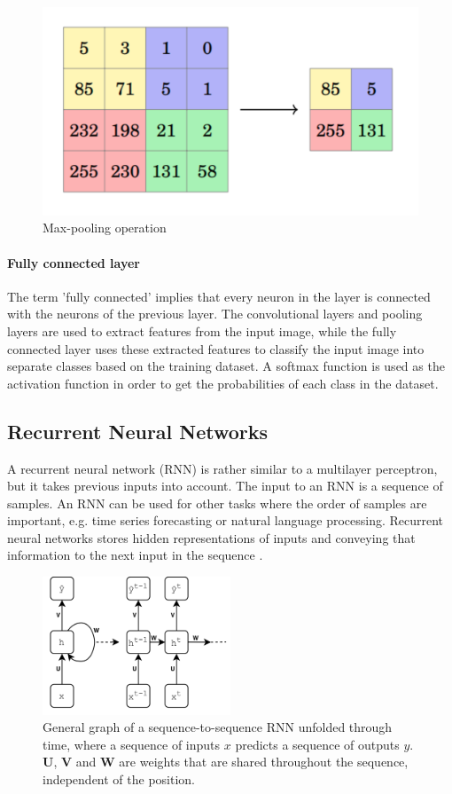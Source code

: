             \begin{figure}[h!]
                \centering
                    \includegraphics[width=0.4\linewidth]{figures/maxpooling.png}
                \caption{Max-pooling operation}
                \label{fig:maxpool}
            \end{figure}

            \paragraph{Fully connected layer} The term 'fully connected' implies that every neuron in the layer is connected with the neurons of the previous layer. 
            The convolutional layers and pooling layers are used to extract features from the input image, while the fully connected layer uses these extracted features to classify the input image into separate classes based on the training dataset. 
            A softmax function is used as the activation function in order to get the probabilities of each class in the dataset. 

        \subsection{Recurrent Neural Networks}

            A recurrent neural network (RNN) is rather similar to a multilayer perceptron, but it takes previous inputs into account. 
            The input to an RNN is a sequence of samples. 
            An RNN can be used for other tasks where the order of samples are important, e.g. time series forecasting or natural language processing.
            Recurrent neural networks stores hidden representations of inputs and conveying that information to the next input in the sequence \cite{Goodfellow-et-al-2016}. 

            \begin{figure}[t]
                \centering
                \includegraphics[width=0.5\textwidth]{figures/simple_rnn.png}
                \caption{General graph of a sequence-to-sequence RNN unfolded through time, where a sequence of inputs $x$ predicts a sequence of outputs $y$. $\mathbf{U}$, $\mathbf{V}$ and $\mathbf{W}$ are weights that are shared throughout the sequence, independent of the position.}
                \label{fig:rnn}
            \end{figure}

